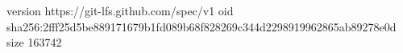 version https://git-lfs.github.com/spec/v1
oid sha256:2fff25d5be889171679b1fd089b68f828269c344d2298919962865ab89278e0d
size 163742
